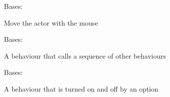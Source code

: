 \documentclass[letterpaper,10pt,english]{sphinxmanual}
\begin{document}
\begin{fulllineitems}
\label{blocks:serge.blocks.behaviours.MoveWithMouse}
Bases: {\hyperref[blocks:serge.blocks.behaviours.Behaviour]{}}

Move the actor with the mouse

\end{fulllineitems}


\begin{fulllineitems}
\label{blocks:serge.blocks.behaviours.OneShotSequence}
Bases: {\hyperref[blocks:serge.blocks.behaviours.Behaviour]{}}

A behaviour that calls a sequence of other behaviours

\end{fulllineitems}


\begin{fulllineitems}
\label{blocks:serge.blocks.behaviours.Optional}
Bases: {\hyperref[blocks:serge.blocks.behaviours.TwoOptions]{}}

A behaviour that is turned on and off by an option

\end{fulllineitems}

\end{document}
